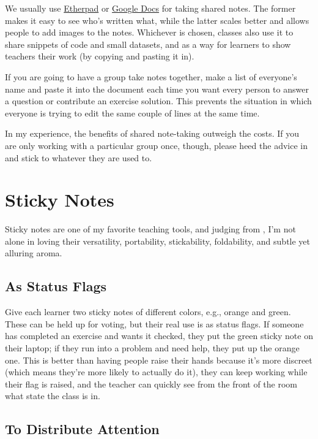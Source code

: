 We usually use \href{http://etherpad.org}{Etherpad} or
\href{https://docs.google.com}{Google Docs} for taking shared notes.
The former makes it easy to see who's written what, while the latter
scales better and allows people to add images to the notes.  Whichever
is chosen, classes also use it to share snippets of code and small
datasets, and as a way for learners to show teachers their work (by
copying and pasting it in).

If you are going to have a group take notes together, make a list of
everyone's name and paste it into the document each time you want
every person to answer a question or contribute an exercise
solution. This prevents the situation in which everyone is trying to
edit the same couple of lines at the same time.

In my experience, the benefits of shared note-taking outweigh the
costs.  If you are only working with a particular group once, though,
please heed the advice in  and stick to
whatever they are used to.

\section{Sticky Notes}\label{s:classroom-sticky-notes}

Sticky notes are one of my favorite teaching tools, and judging from
\cite{Ward2015}, I'm not alone in loving their versatility,
portability, stickability, foldability, and subtle yet alluring aroma.

\subsection{As Status Flags}\label{s:classroom-status-flags}

Give each learner two sticky notes of different colors, e.g., orange
and green. These can be held up for voting, but their real use is as
status flags. If someone has completed an exercise and wants it
checked, they put the green sticky note on their laptop; if they run
into a problem and need help, they put up the orange one. This is
better than having people raise their hands because it's more discreet
(which means they're more likely to actually do it), they can keep
working while their flag is raised, and the teacher can quickly see
from the front of the room what state the class is in.

\subsection{To Distribute Attention}\label{s:classroom-attention}

